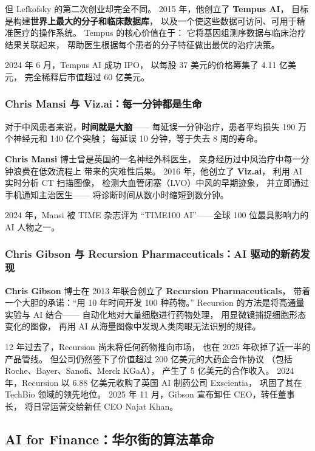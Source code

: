 但 Lefkofsky 的第二次创业却完全不同。
2015 年，他创立了 \textbf{Tempus AI}，
目标是构建\textbf{世界上最大的分子和临床数据库}，
以及一个使这些数据可访问、可用于精准医疗的操作系统。
Tempus 的核心价值在于：
它将基因组测序数据与临床治疗结果关联起来，
帮助医生根据每个患者的分子特征做出最优的治疗决策。

2024 年 6 月，Tempus AI 成功 IPO，
以每股 37 美元的价格筹集了 4.11 亿美元，
完全稀释后市值超过 60 亿美元。

\subsubsection{Chris Mansi 与 Viz.ai：每一分钟都是生命}

对于中风患者来说，\textbf{时间就是大脑}——
每延误一分钟治疗，患者平均损失 190 万个神经元和 140 亿个突触；
每延误 10 分钟，等于失去 8 周的寿命。

\textbf{Chris Mansi} 博士曾是英国的一名神经外科医生，
亲身经历过中风治疗中每一分钟浪费在低效流程上
带来的灾难性后果。
2016 年，他创立了 \textbf{Viz.ai}，
利用 AI 实时分析 CT 扫描图像，
检测大血管闭塞（LVO）中风的早期迹象，
并立即通过手机通知主治医生——
将诊断时间从数小时缩短到数分钟。

2024 年，Mansi 被 TIME 杂志评为
``TIME100 AI''——全球 100 位最具影响力的 AI 人物之一。

\subsubsection{Chris Gibson 与 Recursion Pharmaceuticals：AI 驱动的新药发现}

\textbf{Chris Gibson} 博士在 2013 年联合创立了 \textbf{Recursion Pharmaceuticals}，
带着一个大胆的承诺：``用 10 年时间开发 100 种药物。''
Recursion 的方法是将高通量实验与 AI 结合——
自动化地对大量细胞进行药物处理，
用显微镜捕捉细胞形态变化的图像，
再用 AI 从海量图像中发现人类肉眼无法识别的规律。

12 年过去了，Recursion 尚未将任何药物推向市场，
也在 2025 年砍掉了近一半的产品管线。
但公司仍然签下了价值超过 200 亿美元的大药企合作协议
（包括 Roche、Bayer、Sanofi、Merck KGaA），
产生了 5 亿美元的合作收入。
2024 年，Recursion 以 6.88 亿美元收购了英国 AI 制药公司 Exscientia，
巩固了其在 TechBio 领域的领先地位。
2025 年 11 月，Gibson 宣布卸任 CEO，转任董事长，
将日常运营交给新任 CEO Najat Khan。


\subsection{AI for Finance：华尔街的算法革命}
\label{subsec:finance-ai}

